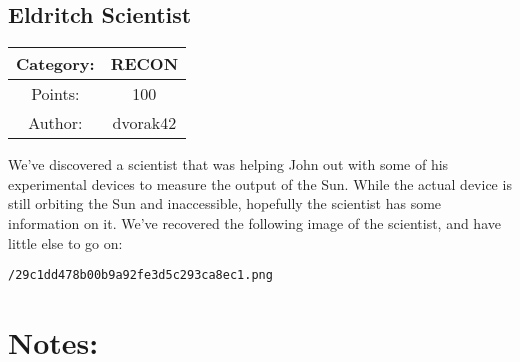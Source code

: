 \begin{center}
\section*{Eldritch Scientist}
{\large
\begin{tabular}{| c c |}
\hline
Category: & RECON\\\hline
Points: & 100\\\hline
Author: & dvorak42\\\hline
\end{tabular}
}
\end{center}
\vspace{0.5in}

{\large
We've discovered a scientist that was helping John out with some of his experimental devices to measure the output of the Sun. While the actual device is still orbiting the Sun and inaccessible, hopefully the scientist has some information on it. We've recovered the following image of the scientist, and have little else to go on:
}
\vspace{0.25in}
\begin{center}
  {\Large\tt /29c1dd478b00b9a92fe3d5c293ca8ec1.png}
\end{center}

\vspace{0.25in}
\section*{Notes:}
